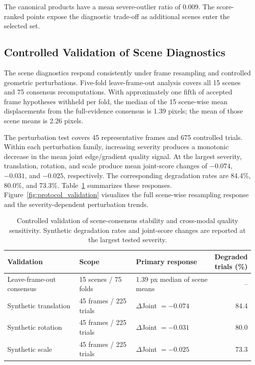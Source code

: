 The canonical products have a mean severe-outlier ratio of 0.009. The
score-ranked points expose the diagnostic trade-off as additional scenes enter the selected set.

\subsection{Controlled Validation of Scene Diagnostics}

The scene diagnostics respond consistently under frame resampling and controlled geometric
perturbations. Five-fold leave-frame-out analysis covers all 15 scenes and 75 consensus
recomputations. With approximately one fifth of accepted frame hypotheses withheld per fold, the
median of the 15 scene-wise mean displacements from the full-evidence consensus is 1.39 pixels;
the mean of those scene means is 2.26 pixels.

The perturbation test covers 45 representative frames and 675 controlled trials. Within each
perturbation family, increasing severity produces a monotonic decrease in the mean joint edge/gradient
quality signal. At the largest severity, translation, rotation, and scale produce mean joint-score
changes of $-0.074$, $-0.031$, and $-0.025$, respectively. The corresponding degradation rates are
84.4\%, 80.0\%, and 73.3\%. Table~\ref{tab:protocol_validation} summarizes these responses.
Figure~\ref{fig:protocol_validation} visualizes the full scene-wise resampling response and
the severity-dependent perturbation trends.

\begin{table}[!htbp]
\caption{Controlled validation of scene-consensus stability and cross-modal quality sensitivity. Synthetic
degradation rates and joint-score changes are reported at the largest tested severity.}
\label{tab:protocol_validation}
\centering
\manuscripttablestyle
\begin{tabularx}{\textwidth}{@{}Xp{2.7cm}Xr@{}}
\toprule
Validation & Scope & Primary response & \shortstack{Degraded\\trials (\%)} \\
\midrule
Leave-frame-out consensus & 15 scenes / 75 folds & 1.39 px median of scene means & -- \\
Synthetic translation & 45 frames / 225 trials & $\Delta$Joint $=-0.074$ & 84.4 \\
Synthetic rotation & 45 frames / 225 trials & $\Delta$Joint $=-0.031$ & 80.0 \\
Synthetic scale & 45 frames / 225 trials & $\Delta$Joint $=-0.025$ & 73.3 \\
\bottomrule
\end{tabularx}
\end{table}

